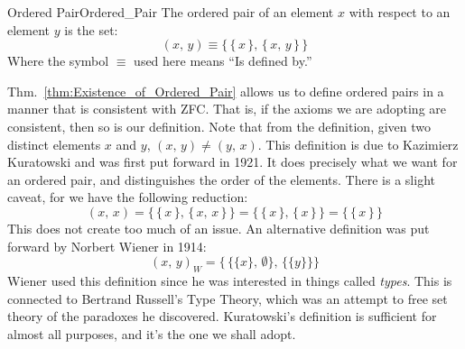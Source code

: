         \begin{ldefinition}{Ordered Pair}{Ordered_Pair}
            The \gls{ordered pair} of an element $x$ with respect
            to an element $y$ is the set:
            \begin{equation}
                (x,\,y)\equiv\big\{\,\{\,x\,\},\,\{\,x,\,y\,\}\,\big\}
            \end{equation}
            Where the symbol $\equiv$ used here means ``Is defined by.''
        \end{ldefinition}
        Thm.~\ref{thm:Existence_of_Ordered_Pair} allows us to define ordered
        pairs in a manner that is consistent with ZFC. That is, if the axioms
        we are adopting are consistent, then so is our definition. Note that
        from the definition, given two distinct elements $x$ and $y$,
        $(x,\,y)\ne(y,\,x)$. This definition is due to Kazimierz Kuratowski
        and was first put forward in 1921. It does precisely what we want for
        an ordered pair, and distinguishes the order of the elements. There
        is a slight caveat, for we have the following reduction:
        \begin{equation}
            (x,\,x)=\big\{\,\{\,x\,\},\,\{\,x,\,x\,\}\,\big\}
                   =\big\{\,\{\,x\,\},\,\{\,x\,\}\,\big\}
                   =\big\{\,\{\,x\,\}\,\big\}
        \end{equation}
        This does not create too much of an issue.
        An alternative definition was put forward by Norbert Wiener in 1914:
        \begin{equation}
            (x,\,y)_{W}=\Big\{\,\big\{\{x\},\,\emptyset\big\},\,
                                \big\{\{y\}\big\}\Big\}
        \end{equation}
        Wiener used this definition since he was interested in things called
        \textit{types}. This is connected to Bertrand Russell's Type Theory,
        which was an attempt to free set theory of the paradoxes he
        discovered. Kuratowski's definition is sufficient for almost all
        purposes, and it's the one we shall adopt.
